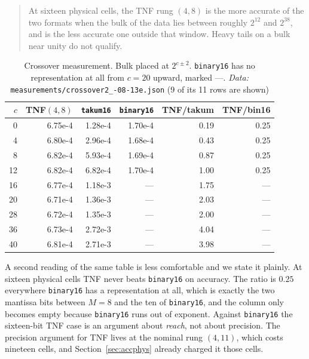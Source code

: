 \begin{quote}
At sixteen physical cells, the TNF rung $(4,8)$ is the more accurate of the two
formats when the bulk of the data lies between roughly $2^{12}$ and $2^{38}$, and
is the less accurate one outside that window. Heavy tails on a bulk near unity do
not qualify.
\end{quote}

\begin{table}[htbp]\centering\small
\caption{Crossover measurement. Bulk placed at $2^{c\pm 2}$. \texttt{binary16}
has no representation at all from $c=20$ upward, marked ---. \emph{Data:} \texttt{measurements/\allowbreak crossover2\_-08-13e.json} (9 of its 11 rows are shown)}
\label{tab:window}
\begin{tabular}{rrrrrr}
\hline
$c$ & TNF$(4,8)$ & \texttt{takum16} & \texttt{binary16} & TNF/takum & TNF/bin16 \\
\hline
0 & 6.75e-4 & 1.28e-4 & 1.70e-4 & 0.19 & 0.25 \\
4 & 6.80e-4 & 2.96e-4 & 1.68e-4 & 0.43 & 0.25 \\
8 & 6.82e-4 & 5.93e-4 & 1.69e-4 & 0.87 & 0.25 \\
12 & 6.82e-4 & 6.82e-4 & 1.70e-4 & 1.00 & 0.25 \\
16 & 6.77e-4 & 1.18e-3 & --- & 1.75 & --- \\
20 & 6.71e-4 & 1.36e-3 & --- & 2.03 & --- \\
28 & 6.72e-4 & 1.35e-3 & --- & 2.00 & --- \\
36 & 6.73e-4 & 2.72e-3 & --- & 4.04 & --- \\
40 & 6.81e-4 & 2.71e-3 & --- & 3.98 & --- \\
\hline
\end{tabular}
\end{table}

A second reading of the same table is less comfortable and we state it plainly. At
sixteen physical cells TNF never beats \texttt{binary16} on accuracy. The ratio is
$0.25$ everywhere \texttt{binary16} has a representation at all, which is exactly
the two mantissa bits between $M{=}8$ and the ten of \texttt{binary16}, and the
column only becomes empty because \texttt{binary16} runs out of exponent. Against
\texttt{binary16} the sixteen-bit TNF case is an argument about \emph{reach}, not
about precision. The precision argument for TNF lives at the nominal rung
$(4,11)$, which costs nineteen cells, and Section~\ref{sec:accphys} already charged
it those cells.

